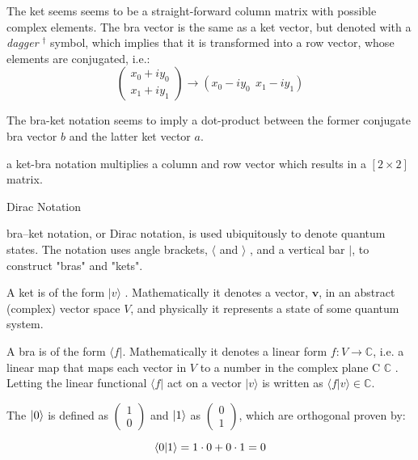 The ket seems seems to be a straight-forward column matrix with possible complex elements. The bra vector is the same as a ket vector, but denoted with a \textit{dagger} $^\dagger$ symbol, which implies that it is transformed into a row vector, whose elements are conjugated, i.e.:
\begin{equation*}
    \begin{pmatrix}x_0 + iy_0 \\ x_1 + iy_1 \end{pmatrix} \to (x_0 - iy_0 \ \  x_1 - iy_1) 
\end{equation*}

The bra-ket notation seems to imply a dot-product between the former conjugate bra vector $b$ and the latter ket vector $a$.

a ket-bra notation multiplies a column and row vector which results in a $[2 \times 2]$ matrix.
\begin{mdframed}[hidealllines=true,backgroundcolor=black!60, fontcolor = white]
\begin{center}Dirac Notation\end{center}
bra–ket notation, or Dirac notation, is used ubiquitously to denote quantum states. The notation uses angle brackets,  $\langle$ and $\rangle$ , and a vertical bar $|$, to construct "bras" and "kets". 

A ket is of the form  $|v\rangle$ . Mathematically it denotes a vector, $\boldsymbol{v}$, in an abstract (complex) vector space $V$, and physically it represents a state of some quantum system.

A bra is of the form $\langle f|$. Mathematically it denotes a linear form $f:V\to \mathbb {C}$, i.e. a linear map that maps each vector in $V$ to a number in the complex plane C $\mathbb{C}$ . Letting the linear functional $\langle f|$ act on a vector $|v\rangle$ is written as $\langle f|v\rangle \in \mathbb {C}$. 
\end{mdframed}

The $\ket{0}$ is defined as $\begin{pmatrix}1\\0\end{pmatrix}$ and $\ket{1}$ as $\begin{pmatrix}0\\1\end{pmatrix}$, which are orthogonal proven by:

\begin{equation*}
    \braket{0}{1} = 1\cdot 0 + 0\cdot 1 = 0
\end{equation*}

